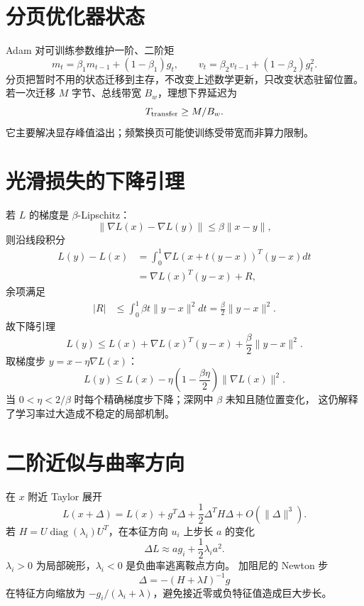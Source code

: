\documentclass[11pt]{article}
\numberwithin{equation}{section}
\newcommand{\1}{\mathbf{1}}
\newcommand{\diag}{\operatorname{diag}}
\begin{document}
\section{分页优化器状态}

Adam 对可训练参数维护一阶、二阶矩
\begin{equation}
 m_t=\beta_1m_{t-1}+(1-\beta_1)g_t,\qquad
 v_t=\beta_2v_{t-1}+(1-\beta_2)g_t^2.
\end{equation}
分页把暂时不用的状态迁移到主存，不改变上述数学更新，只改变状态驻留位置。
若一次迁移 $M$ 字节、总线带宽 $B_w$，理想下界延迟为
\begin{equation}
 T_{\rm transfer}\ge M/B_w.
\end{equation}
它主要解决显存峰值溢出；频繁换页可能使训练受带宽而非算力限制。

\section{光滑损失的下降引理}

若 $L$ 的梯度是 $\beta$-Lipschitz：
\begin{equation}
 \|\nabla L(x)-\nabla L(y)\|
 \le\beta\|x-y\|,
\end{equation}
则沿线段积分
\begin{align}
 L(y)-L(x)
 &=\int_0^1\nabla L(x+t(y-x))^T(y-x)dt\\
 &=\nabla L(x)^T(y-x)+R,
\end{align}
余项满足
\begin{align}
 |R|
 &\le\int_0^1\beta t\|y-x\|^2dt
 =\frac\beta2\|y-x\|^2.
\end{align}
故下降引理
\begin{equation}
 L(y)\le L(x)+\nabla L(x)^T(y-x)
 +\frac\beta2\|y-x\|^2.
\end{equation}
取梯度步 $y=x-\eta\nabla L(x)$：
\begin{equation}
 L(y)\le L(x)-\eta\left(1-\frac{\beta\eta}{2}\right)
 \|\nabla L(x)\|^2.
\end{equation}
当 $0<\eta<2/\beta$ 时每个精确梯度步下降；深网中 $\beta$ 未知且随位置变化，
这仍解释了学习率过大造成不稳定的局部机制。

\section{二阶近似与曲率方向}

在 $x$ 附近 Taylor 展开
\begin{equation}
 L(x+\Delta)=L(x)+g^T\Delta
 +\frac12\Delta^TH\Delta+O(\|\Delta\|^3).
\end{equation}
若 $H=U\diag(\lambda_i)U^T$，在本征方向 $u_i$ 上步长 $a$ 的变化
\begin{equation}
 \Delta L\approx a g_i+\frac12\lambda_i a^2.
\end{equation}
$\lambda_i>0$ 为局部碗形，$\lambda_i<0$ 是负曲率逃离鞍点方向。
加阻尼的 Newton 步
\begin{equation}
 \Delta=-(H+\lambda I)^{-1}g
\end{equation}
在特征方向缩放为 $-g_i/(\lambda_i+\lambda)$，避免接近零或负特征值造成巨大步长。
\end{document}
